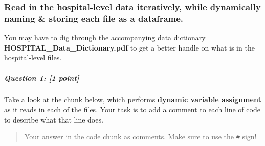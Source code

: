 \documentclass[
]{article}
\begin{document}
\subsubsection{Read in the hospital-level data iteratively, while
dynamically naming \& storing each file as a
dataframe.}\label{read-in-the-hospital-level-data-iteratively-while-dynamically-naming-storing-each-file-as-a-dataframe.}

You may have to dig through the accompanying data dictionary
\textbf{HOSPITAL\_Data\_Dictionary.pdf} to get a better handle on what
is in the hospital-level files.

\subparagraph{\texorpdfstring{\textbf{Question 1}: {[}1
point{]}}{Question 1: {[}1 point{]}}}\label{question-1-1-point}

Take a look at the chunk below, which performs \textbf{dynamic variable
assignment} as it reads in each of the files. Your task is to add a
comment to each line of code to describe what that line does.

\begin{quote}
Your answer in the code chunk as comments. Make sure to use the
\texttt{\#} sign!
\end{quote}
\end{document}
